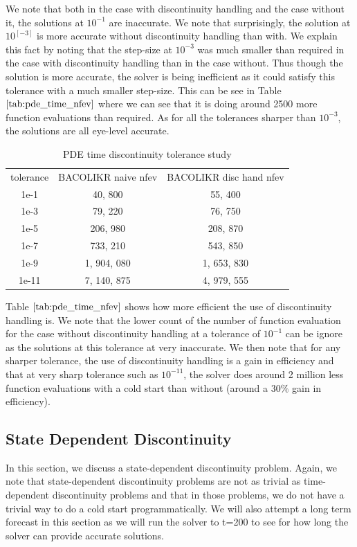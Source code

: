 \documentclass{article}
\begin{document}
We note that both in the case with discontinuity handling and the case without it, the solutions at $10^{-1}$ are inaccurate. We note that surprisingly, the solution at $10^[-3]$ is more accurate without discontinuity handling than with. We explain this fact by noting that the step-size at $10^{-3}$ was much smaller than required in the case with discontinuity handling than in the case without. Thus though the solution is more accurate, the solver is being inefficient as it could satisfy this tolerance with a much smaller step-size. This can be see in Table $\ref{tab:pde_time_nfev}$ where we can see that it is doing around 2500 more function evaluations than required. As for all the tolerances sharper than $10^{-3}$, the solutions are all eye-level accurate.

\begin{table}[h]
\caption {PDE time discontinuity tolerance study} 
\label{tab:pde_time_nfev}
\begin{center}
\begin{tabular}{ c c c  } 
tolerance & BACOLIKR naive nfev & BACOLIKR disc hand nfev \\ 
1e-1      &   40, 800           &   55, 400   \\
1e-3      &   79, 220           &  76, 750    \\
1e-5      &  206, 980           &  208, 870    \\
1e-7      &  733, 210           &  543, 850     \\
1e-9      & 1, 904, 080         & 1, 653, 830   \\
1e-11     & 7, 140, 875         & 4, 979, 555   \\
\end{tabular}
\end{center}
\end{table}

Table $\ref{tab:pde_time_nfev}$ shows how more efficient the use of discontinuity handling is. We note that the lower count of the number of function evaluation for the case without discontinuity handling at a tolerance of $10^{-1}$ can be ignore as the solutions at this tolerance at very inaccurate. We then note that for any sharper tolerance, the use of discontinuity handling is a gain in efficiency and that at very sharp tolerance such as $10^{-11}$, the solver does around 2 million less function evaluations with a cold start than without (around a $30\%$ gain in efficiency). 

\subsection{State Dependent Discontinuity}
\label{subsection:pde_state_intro}
In this section, we discuss a state-dependent discontinuity problem. Again, we note that state-dependent discontinuity problems are not as trivial as time-dependent discontinuity problems and that in those problems, we do not have a trivial way to do a cold start programmatically. We will also attempt a long term forecast in this section as we will run the solver to t=200 to see for how long the solver can provide accurate solutions.
\end{document}
